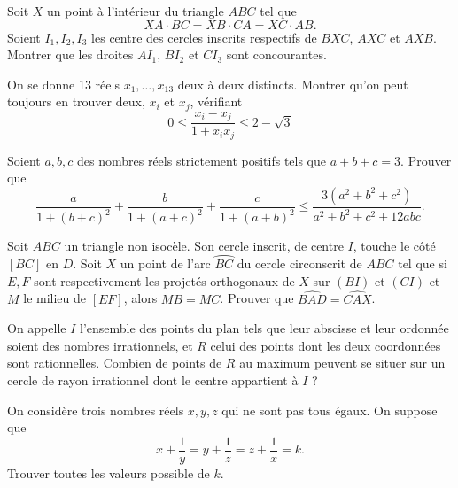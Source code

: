 \begin{exo}{}
Soit $X$ un point à l'intérieur du triangle $ABC$ tel que
\[XA\cdot BC = XB\cdot CA = XC\cdot AB.\]
Soient $I_1, I_{2}, I_{3}$  les centre des cercles inscrits respectifs de $BXC$, $AXC$ et $AXB$. Montrer que les droites $AI_1$, $BI_2$ et $CI_3$ sont concourantes.


\end{exo}

\begin{exo}{}
On se donne 13 réels $x_1,\dots,x_{13}$ deux à deux distincts.
Montrer qu'on peut toujours en trouver deux, $x_i$ et $x_j$, vérifiant
\[0 \leq \frac{x_i-x_j}{1+x_ix_j} \leq 2-\sqrt{3}\]
\end{exo}

\begin{exo}{}Soient $a,b,c$ des nombres réels strictement positifs tels que $a+b+c=3$. Prouver que
$$ \frac{a}{1+(b+c)^2}+\frac{b}{1+(a+c)^2}+\frac{c}{1+(a+b)^2}\le\frac{3(a^2+b^2+c^2)}{a^2+b^2+c^2+12abc}.$$
\end{exo}

\begin{exo}{}Soit $ABC$ un triangle non isocèle. Son cercle inscrit, de centre $I$, touche le côté $[BC]$ en $D$. Soit $X$ un point de l'arc $ \wideparen {BC}$ du cercle circonscrit de $ABC$ tel que si $E,F$ sont respectivement les projetés orthogonaux de $X$ sur $(BI)$ et $(CI)$ et $M$ le milieu de $[EF]$, alors $MB=MC$. Prouver que $ \widehat{BAD}=\widehat{CAX} $.
\end{exo}


\begin{exo}{}
On appelle $I$ l'ensemble des points du plan tels que leur abscisse et leur ordonnée soient des nombres irrationnels, et $R$ celui des points dont les deux coordonnées sont rationnelles. Combien de points de $R$ au maximum peuvent se situer sur un cercle de rayon irrationnel dont le centre appartient à $I$ ? 
\end{exo}


\begin{exo}{}
On considère trois nombres réels $x,y,z$ qui ne sont pas tous égaux. On suppose que 
$$x+ \frac{1}{y}= y+ \frac{1}{z}=z+ \frac{1}{x}=k.$$
Trouver toutes les valeurs possible de $k$.
\end{exo}


